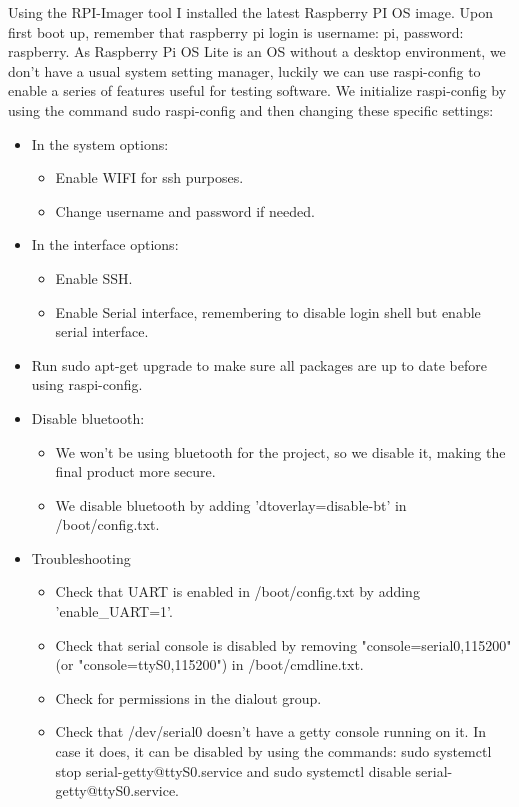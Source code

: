 \documentclass[a4paper,11pt]{scrartcl}
\begin{document}
Using the RPI-Imager tool I installed the latest Raspberry PI OS image. Upon first boot up, remember that raspberry pi login is username: pi, password: raspberry. As Raspberry Pi OS Lite is an OS without a desktop environment, we don't have a usual system setting manager, luckily we can use raspi-config to enable a series of features useful for testing software. We initialize raspi-config by using the command sudo raspi-config and then changing these specific settings:
\begin{itemize}    
    \item In the system options:
    \begin{itemize}
        \item Enable WIFI for ssh purposes.
        \item Change username and password if needed.
    \end{itemize}
    \item In the interface options:
    \begin{itemize}
        \item Enable SSH.
        \item Enable Serial interface, remembering to disable login shell but enable serial interface.
    \end{itemize}
    \item Run sudo apt-get upgrade to make sure all packages are up to date before using raspi-config.
    \item Disable bluetooth:
        \begin{itemize}
            \item We won't be using bluetooth for the project, so we disable it, making the final product more secure.
            \item We disable bluetooth by adding 'dtoverlay=disable-bt' in /boot/config.txt.
        \end{itemize}
    \item Troubleshooting
        \begin{itemize}
            \item Check that UART is enabled in /boot/config.txt by adding 'enable\_UART=1'.
            \item Check that serial console is disabled by removing "console=serial0,115200" (or "console=ttyS0,115200") in /boot/cmdline.txt.
            \item Check for permissions in the dialout group.
            \item Check that /dev/serial0 doesn't have a getty console running on it. In case it does, it can be disabled by using the commands: sudo systemctl stop serial-getty@ttyS0.service and sudo systemctl disable serial-getty@ttyS0.service.
        \end{itemize}
\end{itemize}
\end{document}
